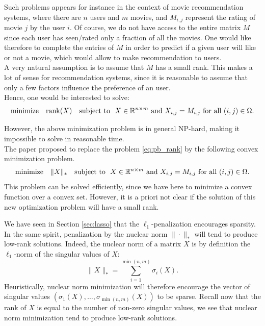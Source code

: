 \documentclass[11pt,nocut]{article}
\begin{document}
Such problems appears for instance in the context of movie recommendation systems, where there are $n$ users and $m$ movies, and $M_{i,j}$ represent the rating of movie $j$ by the user $i$. Of course, we do not have access to the entire matrix $M$ since each user has seen/rated only a fraction of all the movies. 
One would like therefore to complete the entries of $M$ in order to predict if a given user will like or not a movie, which would allow to make recommendation to users.
\\

A very natural assumption is to assume that $M$ has a small rank. 
This makes a lot of sense for recommendation systems, since it is reasonable to assume that only a few factors influence the preference of an user.
\\

Hence, one would be interested to solve:
\begin{equation}\label{eq:pb_rank}
	\text{minimize} \quad \rank(X) \quad \text{subject to } \ X \in \R^{n \times m} \ \text{and} \ X_{i,j} = M_{i,j} \ \text{for all} \ (i,j) \in \Omega.
\end{equation}

However, the above minimization problem is in general NP-hard, making it impossible to solve in reasonable time.
\\

The paper \cite{candes2009exact} proposed to replace the problem \eqref{eq:pb_rank}
by the following convex minimization problem.
\begin{equation}\label{eq:pb_nuclear}
	\text{minimize} \quad \|X\|_* \quad \text{subject to } \ X \in \mathbb{R}^{n \times m} \ \text{and} \ X_{i,j} = M_{i,j} \ \text{for all} \ (i,j) \in \Omega.
\end{equation}
This problem can be solved efficiently, since we have here to minimize a convex function over a convex set. However, it is a priori not clear if the solution of this new optimization problem will have a small rank.

We have seen in Section \ref{sec:lasso} that the $\ell_1$-penalization encourages sparsity.
In the same spirit, penalization by the nuclear norm $\| \cdot \|_*$ will tend to produce low-rank solutions. Indeed, the nuclear norm of a matrix $X$ is by definition the $\ell_1$-norm of the singular values of $X$:
$$
\|X\|_* = \sum_{i=1}^{\min(n,m)} \sigma_i(X).
$$
Heuristically, nuclear norm minimization will therefore encourage the vector of singular values $(\sigma_1(X), \dots,\sigma_{\min(n,m)}(X))$ to be sparse. Recall now that the rank of $X$ is equal to the number of non-zero singular values, we see that nuclear norm minimization tend to produce low-rank solutions.
\end{document}
